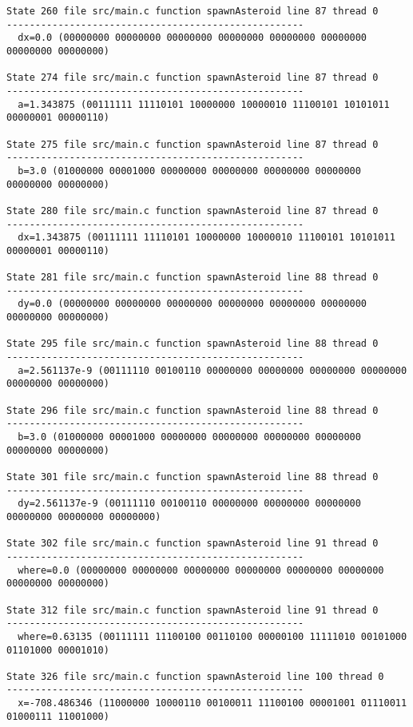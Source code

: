 \begin{verbatim}
State 260 file src/main.c function spawnAsteroid line 87 thread 0
----------------------------------------------------
  dx=0.0 (00000000 00000000 00000000 00000000 00000000 00000000 00000000 00000000)

State 274 file src/main.c function spawnAsteroid line 87 thread 0
----------------------------------------------------
  a=1.343875 (00111111 11110101 10000000 10000010 11100101 10101011 00000001 00000110)

State 275 file src/main.c function spawnAsteroid line 87 thread 0
----------------------------------------------------
  b=3.0 (01000000 00001000 00000000 00000000 00000000 00000000 00000000 00000000)

State 280 file src/main.c function spawnAsteroid line 87 thread 0
----------------------------------------------------
  dx=1.343875 (00111111 11110101 10000000 10000010 11100101 10101011 00000001 00000110)

State 281 file src/main.c function spawnAsteroid line 88 thread 0
----------------------------------------------------
  dy=0.0 (00000000 00000000 00000000 00000000 00000000 00000000 00000000 00000000)

State 295 file src/main.c function spawnAsteroid line 88 thread 0
----------------------------------------------------
  a=2.561137e-9 (00111110 00100110 00000000 00000000 00000000 00000000 00000000 00000000)

State 296 file src/main.c function spawnAsteroid line 88 thread 0
----------------------------------------------------
  b=3.0 (01000000 00001000 00000000 00000000 00000000 00000000 00000000 00000000)

State 301 file src/main.c function spawnAsteroid line 88 thread 0
----------------------------------------------------
  dy=2.561137e-9 (00111110 00100110 00000000 00000000 00000000 00000000 00000000 00000000)

State 302 file src/main.c function spawnAsteroid line 91 thread 0
----------------------------------------------------
  where=0.0 (00000000 00000000 00000000 00000000 00000000 00000000 00000000 00000000)

State 312 file src/main.c function spawnAsteroid line 91 thread 0
----------------------------------------------------
  where=0.63135 (00111111 11100100 00110100 00000100 11111010 00101000 01101000 00001010)

State 326 file src/main.c function spawnAsteroid line 100 thread 0
----------------------------------------------------
  x=-708.486346 (11000000 10000110 00100011 11100100 00001001 01110011 01000111 11001000)


\end{verbatim}
